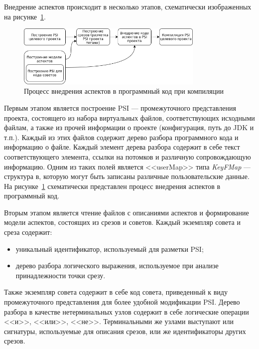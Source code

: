 \documentclass[conference]{IEEEtran}
\begin{document}

Внедрение аспектов происходит в несколько этапов, схематически изображенных на
рисунке~\ref{fig:aspect_weaving}.
\begin{figure}[!t]
\centering
\includegraphics[width=0.8\textwidth]{aspect_weaving}
\caption{Процесс внедрения аспектов в программный код при компиляции}
\label{fig:aspect_weaving}
\end{figure}

Первым этапом является построение PSI --- промежуточного представления проекта, 
состоящего из набора виртуальных файлов, соответствующих исходными файлам, а 
также из прочей информации о проекте (конфигурация, путь до JDK и т.п.).
Каждый из этих файлов содержит дерево разбора программного кода и информацию о
файле.
Каждый элемент дерева разбора содержит в себе текст соответствующего элемента,
ссылки на потомков и различную сопровождающую информацию.
Одним из таких полей является <<userMap>> типа \textit{KeyFMap} --- структура в,
которую могут быть записаны различные пользовательские данные.
На рисунке~\ref{fig:aspect_weaving} схематически представлен процесс внедрения
аспектов в программный код.

Вторым этапом является чтение файлов с описаниями аспектов и формирование
модели аспектов, состоящих из срезов и советов.
Каждый экземпляр совета и среза содержит:
\begin{itemize}
	\item уникальный идентификатор, используемый для разметки PSI;
	\item дерево разбора логического выражения, используемое при анализе
		  принадлежности точки срезу.
\end{itemize}
Также экземпляр совета содержит в себе код совета, приведенный к виду
промежуточного представления для более удобной модификации PSI.
Дерево разбора в качестве нетерминальных узлов содержит в себе логические
операции <<и>>, <<или>>, <<не>>.
Терминальными же узлами выступают или сигнатуры, используемые для описания
срезов, или же идентификаторы других срезов.
\end{document}
